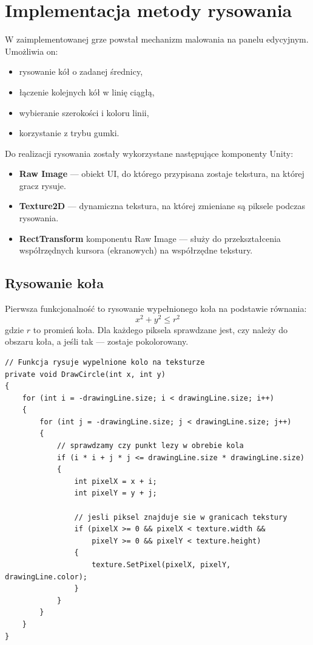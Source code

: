 \documentclass[a4paper,12pt]{book} %
\begin{document}
\section{Implementacja metody rysowania}

W zaimplementowanej grze powstał mechanizm malowania na panelu edycyjnym. 
Umożliwia on:
\begin{itemize}
  \item rysowanie kół o zadanej średnicy,
  \item łączenie kolejnych kół w linię ciągłą,
  \item wybieranie szerokości i koloru linii,
  \item korzystanie z trybu gumki.
\end{itemize}

Do realizacji rysowania zostały wykorzystane następujące komponenty Unity:
\begin{itemize}
  \item \textbf{Raw Image} --- obiekt UI, do którego przypisana zostaje tekstura, na której gracz rysuje.
  \item \textbf{Texture2D} --- dynamiczna tekstura, na której zmieniane są piksele podczas rysowania.
  \item \textbf{RectTransform} komponentu Raw Image --- służy do przekształcenia współrzędnych kursora (ekranowych) na współrzędne tekstury.
\end{itemize}


\subsection{Rysowanie koła}

Pierwsza funkcjonalność to rysowanie wypełnionego koła na podstawie równania:
\[
x^2 + y^2 \leq r^2
\]
gdzie \(r\) to promień koła.  
Dla każdego piksela sprawdzane jest, czy należy do obszaru koła, a jeśli tak — zostaje pokolorowany.

\begin{lstlisting}[language=CSharp, caption={Funkcja DrawCircle}, label={lst:drawcircle}]
// Funkcja rysuje wypelnione kolo na teksturze
private void DrawCircle(int x, int y)
{
    for (int i = -drawingLine.size; i < drawingLine.size; i++)
    {
        for (int j = -drawingLine.size; j < drawingLine.size; j++)
        {
            // sprawdzamy czy punkt lezy w obrebie kola
            if (i * i + j * j <= drawingLine.size * drawingLine.size)
            {
                int pixelX = x + i;
                int pixelY = y + j;
                
                // jesli piksel znajduje sie w granicach tekstury
                if (pixelX >= 0 && pixelX < texture.width &&
                    pixelY >= 0 && pixelY < texture.height) 
                {
                    texture.SetPixel(pixelX, pixelY, drawingLine.color);
                }
            }
        }
    }
}
\end{lstlisting}
\end{document}
